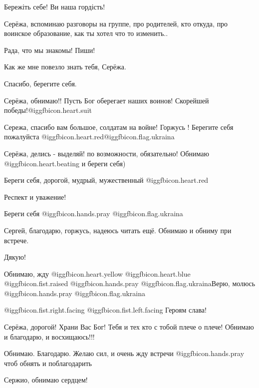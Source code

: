 \begin{itemize}
Бережіть себе! Ви наша гордість!


Серёжа, вспоминаю разговоры на группе, про родителей, кто откуда, про воинское
образование, как ты хотел что то изменить..

Рада, что мы знакомы! Пиши!

Как же мне повезло знать тебя, Серёжа.

Спасибо, берегите себя.


Серёжа, обнимаю!! Пусть Бог оберегает наших воинов! Скорейшей
победы!@igg{fbicon.heart.suit}


Сережа, спасибо вам большое, солдатам на войне! Горжусь ! Берегите себя
пожалуйста @igg{fbicon.heart.red}@igg{fbicon.flag.ukraina}

Серёжа, делись - выделяй! по возможности, обязательно! Обнимаю  @igg{fbicon.heart.beating}  и береги себя)

Береги себя, дорогой, мудрый, мужественный @igg{fbicon.heart.red}

Респект и уважение!

Береги себя  @igg{fbicon.hands.pray} @igg{fbicon.flag.ukraina}

Сергей, благодарю, горжусь, надеюсь читать ещё. Обнимаю и обниму при встрече.

Дякую!


Обнимаю, жду @igg{fbicon.heart.yellow}  @igg{fbicon.heart.blue}
@igg{fbicon.fist.raised}  @igg{fbicon.hands.pray}
@igg{fbicon.flag.ukraina}Верю, молюсь @igg{fbicon.hands.pray}
@igg{fbicon.flag.ukraina}

 @igg{fbicon.fist.right.facing}  @igg{fbicon.fist.left.facing}  Героям слава!

Серёжа, дорогой! Храни Вас Бог! Тебя и тех кто с тобой плече о плече! Обнимаю и благодарю, и восхищаюсь!!!

Обнимаю. Благодарю. Желаю сил, и очень жду встречи  @igg{fbicon.hands.pray}  чтоб обнять и поблагодарить

Сержио, обнимаю сердцем!


\end{itemize}
